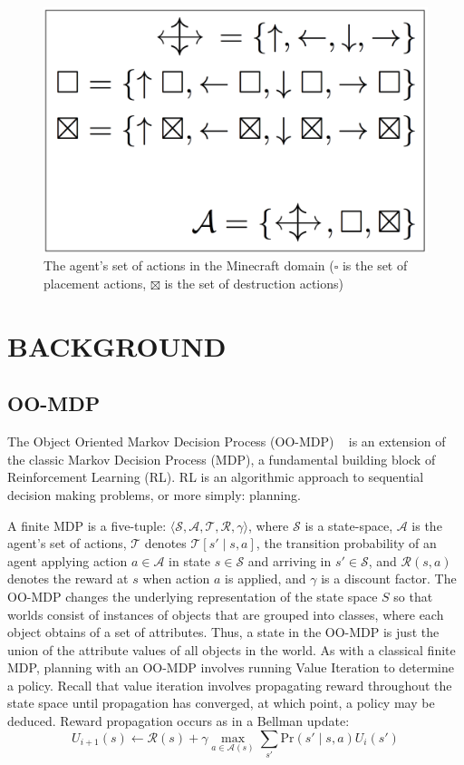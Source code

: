 \documentclass[]{article}
\begin{document}
\begin{figure}
\centering
\includegraphics[scale = 0.12]{figures/mc_action_set.png}
\caption{The agent's set of actions in the Minecraft domain ($\square$ is the set of placement actions, $\boxtimes$ is the set of destruction actions)\label{fig:mc_action_set}}
\end{figure}

\section{BACKGROUND}

\subsection{OO-MDP}

The Object Oriented Markov Decision Process (OO-MDP) ~\citep{diuk08} is an extension of the classic Markov Decision Process (MDP), a fundamental building block of Reinforcement Learning (RL). RL is an algorithmic approach to sequential decision making problems, or more simply: planning.

A finite MDP is a five-tuple: $\langle \mathcal{S}, \mathcal{A}, \mathcal{T}, \mathcal{R}, \gamma \rangle$, where $\mathcal{S}$ is a state-space, $\mathcal{A}$ is the agent's set of actions, $\mathcal{T}$ denotes $\mathcal{T}[s' \mid s,a]$, the transition probability of an agent applying action $a \in \mathcal{A}$ in state $s \in \mathcal{S}$ and arriving in $s' \in \mathcal{S}$, and $\mathcal{R}(s,a)$ denotes the reward at $s$ when action $a$ is applied, and $\gamma$ is a discount factor. The OO-MDP changes the underlying representation of the state space $S$ so that worlds consist of instances of objects that are grouped into classes, where each object obtains of a set of attributes. Thus, a state in the OO-MDP is just the union of the attribute values of all objects in the world. As with a classical finite MDP, planning with an OO-MDP involves running Value Iteration to determine a policy. Recall that value iteration involves propagating reward throughout the state space until propagation has converged, at which point, a policy may be deduced. Reward propagation occurs as in a Bellman update:
\begin{equation}
U_{i+1}(s) \leftarrow \mathcal{R}(s) + \gamma \max_{a \in \mathcal{A}(s)} \sum_{s'} \text{Pr}(s' \mid s, a)U_i(s')
\end{equation}
\end{document}
